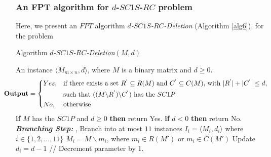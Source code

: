 \documentclass[review, 1p]{elsarticle}
\begin{document}
\subsubsection{\textup{\textbf{An FPT algorithm for $d$-$SC1S$-$RC$ problem}}} \label{fptrc}
Here, we present an $FPT$ algorithm \textit{$d$-$SC1S$-$RC$-Deletion} (Algorithm \ref{alg6}), for the problem \begin{algorithm}[h]
\caption{Algorithm  \textit{$d$-$SC1S$-$RC$-Deletion}$(M,d)$\label{alg6}}
\begin{algorithmic}[1] 
 \Require An instance $\langle M_{m \times n},d \rangle$, where $M$ is a binary matrix and $d \geq 0$.\vspace{-0.1 in} \[ \hspace{-0.26 in}\textbf{Output} = \begin{dcases*} Yes,  & if there exists a set $R^{'} \subseteq R(M)$ and $C^{'} \subseteq C(M)$, with $\vert R^{'} \vert + \vert C^{'} \vert \leq d$, \\ & such that  $((M \backslash  R^{'}) \backslash C^{'})$ has the $SC1P$  \\  
   No,     & otherwise
\end{dcases*}
\] \vspace{-0.15 in}
 \State \textbf{if} {$M$ has the $SC1P$ and $d \geq 0$} \textbf{then} return Yes. \vspace{-0.08 in}
 \State \textbf{if}  {$d < 0$} \textbf{then} return No. \vspace{-0.05 in} \newline \vspace{-0.08 in}
  \noindent \textit{\textbf{Branching Step:}}
 ,  
\vspace{-0.05 in} \newline \vspace{-0.05 in}
  \indent Branch into at most $11$  instances $I_{i}=\langle M_{i}, d_{i}\rangle$ where $i \in \{1,2,\ldots,11\}$ \vspace{-0.05 in} \newline \vspace{-0.05 in}
  \indent $M_{i} = M \backslash m_{i}$, where $m_{i} \in R(M')$ or $m_{i} \in C(M')$ \vspace{-0.05 in} \newline \vspace{-0.05 in}  
 \indent Update $d_{i} = d -1$  \hspace{1.0 in}// Decrement parameter by 1. \vspace{-0.05 in} \newline \vspace{-0.05 in}

\end{algorithmic}
\end{algorithm}
\end{document}
